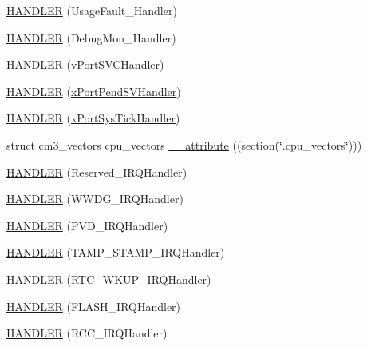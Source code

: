 \begin{DoxyCompactItemize}
\hyperlink{group___p_i_o_s_ga0c2094e67c27767c96a07a3ffa5ce62b}{H\-A\-N\-D\-L\-E\-R} (Usage\-Fault\-\_\-\-Handler)
\item 
\hyperlink{group___p_i_o_s_gae155b63ec7087004e2fbf61c1f29c81b}{H\-A\-N\-D\-L\-E\-R} (Debug\-Mon\-\_\-\-Handler)
\item 
\hyperlink{group___p_i_o_s_ga67d6ce2f5112b5c4b1269e6353f23769}{H\-A\-N\-D\-L\-E\-R} (\hyperlink{_s_t_m32_f4xx_2_libraries_2_free_r_t_o_s_2_source_2portable_2_g_c_c_2_a_r_m___c_m4_f_2port_8c_a859e86b6143d6bc4cf96b2867f408c75}{v\-Port\-S\-V\-C\-Handler})
\item 
\hyperlink{group___p_i_o_s_ga34841d66016106a71850a3c0efb0cbe7}{H\-A\-N\-D\-L\-E\-R} (\hyperlink{_s_t_m32_f4xx_2_libraries_2_free_r_t_o_s_2_source_2portable_2_g_c_c_2_a_r_m___c_m4_f_2port_8c_a4e6b17b7b6e1a92564afdeff7e9dba91}{x\-Port\-Pend\-S\-V\-Handler})
\item 
\hyperlink{group___p_i_o_s_ga3475219dea921ff367d4230f32172c25}{H\-A\-N\-D\-L\-E\-R} (\hyperlink{_s_t_m32_f4xx_2_libraries_2_free_r_t_o_s_2_source_2portable_2_g_c_c_2_a_r_m___c_m4_f_2port_8c_a78100b2d36913d0b45565be8975e5de8}{x\-Port\-Sys\-Tick\-Handler})
\item 
struct cm3\-\_\-vectors cpu\-\_\-vectors \hyperlink{group___p_i_o_s_gaa3091d7ad2e376e149c455e647ad1f03}{\-\_\-\-\_\-attribute} ((section(\char`\"{}.cpu\-\_\-vectors\char`\"{})))
\item 
\hyperlink{group___p_i_o_s_ga2b6188c113332aeef4dfae90570b2a7c}{H\-A\-N\-D\-L\-E\-R} (Reserved\-\_\-\-I\-R\-Q\-Handler)
\item 
\hyperlink{group___p_i_o_s_gacc51fb846ad8dc05370ab051b0307eff}{H\-A\-N\-D\-L\-E\-R} (W\-W\-D\-G\-\_\-\-I\-R\-Q\-Handler)
\item 
\hyperlink{group___p_i_o_s_gacaf5a0d71233fe05229985176913af99}{H\-A\-N\-D\-L\-E\-R} (P\-V\-D\-\_\-\-I\-R\-Q\-Handler)
\item 
\hyperlink{group___p_i_o_s_ga24e33b33d441bd37d1127c6d8b43af02}{H\-A\-N\-D\-L\-E\-R} (T\-A\-M\-P\-\_\-\-S\-T\-A\-M\-P\-\_\-\-I\-R\-Q\-Handler)
\item 
\hyperlink{group___p_i_o_s_ga6c0711ebc5e0b1aaf3e7c7555be644b0}{H\-A\-N\-D\-L\-E\-R} (\hyperlink{group___open_pilot_core_ga7e78266985c97f3b7e8a9f91893657d1}{R\-T\-C\-\_\-\-W\-K\-U\-P\-\_\-\-I\-R\-Q\-Handler})
\item 
\hyperlink{group___p_i_o_s_gad2d12e5da34f9831f5fb626f4d6f9258}{H\-A\-N\-D\-L\-E\-R} (F\-L\-A\-S\-H\-\_\-\-I\-R\-Q\-Handler)
\item 
\hyperlink{group___p_i_o_s_gaa39ba7a7b9c4858c671e0e0811fbdf15}{H\-A\-N\-D\-L\-E\-R} (R\-C\-C\-\_\-\-I\-R\-Q\-Handler)

\end{DoxyCompactItemize}
